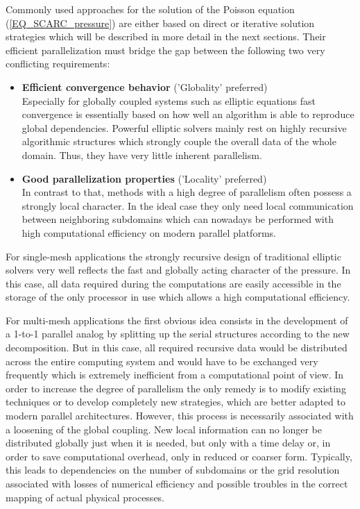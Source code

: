 Commonly used approaches for the solution of the Poisson equation (\ref{EQ_SCARC_pressure}) 
are either based on direct or iterative solution strategies which will be described in more detail in the next sections. Their efficient parallelization must bridge the gap between the following two very conflicting requirements:
\begin{itemize}
\item {\bf Efficient convergence behavior} ('Globality' preferred)\\
Especially for globally coupled systems such as elliptic equations fast convergence is essentially based on how well an algorithm is able to reproduce global dependencies. Powerful elliptic solvers mainly rest on highly recursive algorithmic structures which strongly couple the overall data of the whole domain. Thus, they have very little inherent parallelism. 
\item {\bf Good parallelization properties} ('Locality' preferred)\\
In contrast to that, methods with a high degree of parallelism often possess a strongly local character. In the ideal case they only need local communication between neighboring subdomains which can nowadays be performed with high computational efficiency on modern parallel platforms.  
\end{itemize}
 
For single-mesh applications the strongly recursive design of traditional elliptic solvers very well reflects the fast and globally acting character of the pressure. In this case, all data required during the computations are easily accessible in the storage of the only processor in use which allows a high computational efficiency. 

For multi-mesh applications the first obvious idea consists in the development of a 1-to-1 parallel analog by splitting up the serial structures according to the new decomposition. But in this case, all required recursive data would be distributed across the entire computing system and would have to be exchanged very frequently which is extremely inefficient from a computational point of view.
In order to increase the degree of parallelism the only remedy is to modify existing techniques or to develop completely new strategies, which are better adapted to modern parallel architectures. However, this process is necessarily associated with a loosening of the global coupling.
New local information can no longer be distributed globally just when it is needed, but only with a time delay or, in order to save computational overhead, only in  reduced or coarser form. Typically, this leads to dependencies on the number of subdomains or the grid resolution associated with losses of numerical efficiency and possible troubles in the correct mapping of actual physical processes. 

